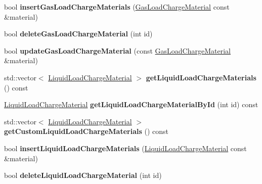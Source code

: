 \begin{DoxyCompactItemize}
\item 
\mbox{\label{class_s_q_lite_af482f51c0d3de08fbfa3e537382a567f}} 
bool {\bfseries insert\+Gas\+Load\+Charge\+Materials} (\hyperlink{class_gas_load_charge_material}{Gas\+Load\+Charge\+Material} const \&material)
\item 
\mbox{\label{class_s_q_lite_a3717a443c1151d717168d323ec6576c1}} 
bool {\bfseries delete\+Gas\+Load\+Charge\+Material} (int id)
\item 
\mbox{\label{class_s_q_lite_a21b8fbcd52ac37fe9e78df164ee8de25}} 
bool {\bfseries update\+Gas\+Load\+Charge\+Material} (const \hyperlink{class_gas_load_charge_material}{Gas\+Load\+Charge\+Material} \&material)
\item 
\mbox{\label{class_s_q_lite_a349f65213cc1b022293bc00ba0a4c3b5}} 
std\+::vector$<$ \hyperlink{class_liquid_load_charge_material}{Liquid\+Load\+Charge\+Material} $>$ {\bfseries get\+Liquid\+Load\+Charge\+Materials} () const
\item 
\mbox{\label{class_s_q_lite_a3f31756b0fc49be7123e7146cbb12c70}} 
\hyperlink{class_liquid_load_charge_material}{Liquid\+Load\+Charge\+Material} {\bfseries get\+Liquid\+Load\+Charge\+Material\+By\+Id} (int id) const
\item 
\mbox{\label{class_s_q_lite_a1a252d50bc2e861325f120a814fddd37}} 
std\+::vector$<$ \hyperlink{class_liquid_load_charge_material}{Liquid\+Load\+Charge\+Material} $>$ {\bfseries get\+Custom\+Liquid\+Load\+Charge\+Materials} () const
\item 
\mbox{\label{class_s_q_lite_aff9ccdb8af003d3a0a3fdc9a85af77d8}} 
bool {\bfseries insert\+Liquid\+Load\+Charge\+Materials} (\hyperlink{class_liquid_load_charge_material}{Liquid\+Load\+Charge\+Material} const \&material)
\item 
\mbox{\label{class_s_q_lite_a2a3451cb60446d9a90da4cb08920dcfe}} 
bool {\bfseries delete\+Liquid\+Load\+Charge\+Material} (int id)
\item 
\mbox{\label{class_s_q_lite_a89805e7aeb9d72f5dfa6928aac681eab}} 

\end{DoxyCompactItemize}
